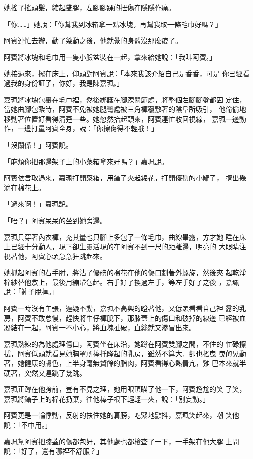 她搖了搖頭髮，縮起雙腿，左腳腳踝的扭傷在隱隱作痛。

「你……」她說：「你幫我到冰箱拿一點冰塊，再幫我取一條毛巾好嗎？」

阿賓連忙去辦，動了幾動之後，他就覺的身體沒那麼痠了。

阿賓將冰塊和毛巾用一隻小臉盆裝在一起，拿來給她說：「我叫阿賓。」

她接過來，擺在床上，仰頭對阿賓說：「本來我該介紹自己是香香，可是
你已經看過我的身份証了，你好，我是陳嘉珮。」

嘉珮將冰塊包裹在毛巾裡，然後綁護在腳踝關節處，將整個左腳腳盤都固
定住，當她曲腳包紮時，阿賓不免被她腿彎處被三角褲覆敷著的陰阜所吸引，
他偷偷地移動著位置好看得清楚一些。她忽然抬起頭來，阿賓連忙收回視線，
嘉珮一邊動作，一邊打量阿賓全身，說：「你擦傷得不輕哦！」

「沒關係！」阿賓說。

「麻煩你把那邊架子上的小藥箱拿來好嗎？」嘉珮說。

阿賓依言取過來，嘉珮打開藥箱，用鑷子夾起綿花，打開優碘的小罐子，
擠出幾滴在棉花上。

「過來啊！」嘉珮說。

「唔？」阿賓呆呆的坐到她旁邊。

嘉珮只穿著內衣褲，充其量也只腳上多包了一條毛巾，曲線畢露，方才她
睡在床上已經十分動人，現下卻生靈活現的在阿賓不到一尺的距離邊，明亮的
大眼睛注視著他，阿賓心頭急急狂跳起來。

她抓起阿賓的右手肘，將沾了優碘的棉花在他的傷口劃著外螺旋，然後夾
起乾淨棉紗替他敷上，最後用繃帶包起。右手好了換過左手，等左手好了之後
，嘉珮說：「褲子脫掉。」

阿賓一時沒有主張，遲疑不動，嘉珮不高興的瞪著他，又低頭看看自己袒
露的乳房，阿賓不敢怠慢，趕快將牛仔褲脫下，那膝蓋上的傷口和破掉的線邊
已經被血凝結在一起，阿賓一不小心，將血塊扯破，血絲就又滲冒出來。

嘉珮熟練的為他處理傷口，阿賓坐在床沿，她蹲在阿賓雙腳之間，不住的
忙碌擦拭，阿賓低頭就看見她胸罩所捧托隆起的乳房，雖然不算大，卻也搖曳
曳的晃動著，她健康的膚色，上半身毫無贅餘的脂肉，阿賓看得心熱情亢，雞
巴本來就半硬著，突然又連跳了幾跳。

嘉珮正蹲在他胯前，豈有不見之理，她用眼頂瞄了他一下，阿賓尷尬的笑
了笑，嘉珮將鑷子上的棉花扔棄，往他棒子根下輕輕一夾，說：「別妄動。」

阿賓更是一輪悸動，反射的扶住她的肩膀，吃緊地顫抖，嘉珮笑起來，嘲
笑他說：「不中用。」

嘉珮幫阿賓把膝蓋的傷都包好，其他處也都檢查了一下，一手架在他大腿
上問說：「好了，還有哪裡不舒服？」

